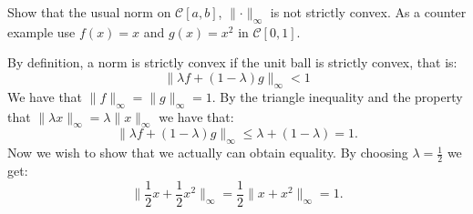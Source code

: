 \begin{problem}
Show that the usual norm on $\mathcal{C}[a,b]$, $\lVert \cdot \rVert_{\infty}$ is not strictly convex. As a counter example use $f(x) = x$ and $g(x) = x^2$ in $\mathcal{C}[0,1]$.
\end{problem}

\begin{solution}
By definition, a norm is strictly convex if the unit ball is strictly convex, that is:
\begin{equation*}
\lVert \lambda f + (1-\lambda)g \rVert_{\infty} < 1
\end{equation*}
We have that $\lVert f \rVert_{\infty} = \lVert g \rVert_{\infty} = 1$. By the triangle inequality and the property that $\lVert \lambda x \rVert_{\infty} = \lambda \lVert x \rVert_{\infty}$ we have that:
\begin{equation*}
\lVert \lambda f + (1-\lambda)g \rVert_{\infty} \leq \lambda + (1-\lambda) = 1.
\end{equation*}
Now we wish to show that we actually can obtain equality. By choosing $\lambda = \frac{1}{2}$ we get:
\begin{equation*}
\lVert \frac{1}{2} x + \frac{1}{2} x^2 \rVert_{\infty} = \frac{1}{2} \lVert x+x^2 \rVert_{\infty} = 1.
\end{equation*}
\end{solution}

